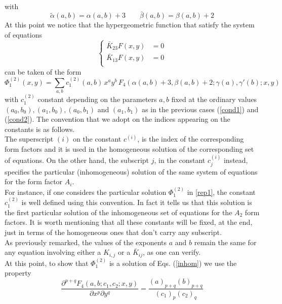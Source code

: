 \documentclass[a4paper,11pt,openright,twoside]{book}
\numberwithin{equation}{section}
\begin{document}
{{\begin{align}
\end{align}
with 
\begin{equation}
\tilde\alpha(a,b)=\alpha(a,b) + 3 \qquad \bar\beta(a,b)=\beta(a,b) +2
\end{equation}
At this point we notice that the hypergeometric function  that satisfy the system of equations
\begin{equation}
\left\{
\begin{split}
	\bar{K}_{23}F(x,y)&=0\\
	\bar{K}_{13}F(x,y)&=0\\
\end{split}
\right.
\end{equation}
can be taken of the form
\begin{equation}
\label{rep1}
\Phi_1^{(2)}(x,y)=\sum_{a,b} c^{(2)}_1(a,b)\,x^a y^b \,F_4(\alpha(a,b) +3, \beta(a,b)+2; \gamma(a), \gamma'(b) ; x, y)
\end{equation}
with $c^{(2)}_1$ constant depending on the parameters $a,b$ fixed at the ordinary values $(a_0,b_0), (a_1,b_0), (a_0,b_1)$ and $(a_1,b_1)$ as in the previous cases (\ref{cond1}) and (\ref{cond2}). 
The convention that we adopt on the indices appearing on the constants is as follows.\\
The superscript $(i)$ on the constant $c^{(i)}$, is the index of the corresponding form factors and it is used in the homogeneous solution of the corresponding set of equations. On the other hand, the subscript $j$, in the constant $c^{(i)}_j$ instead, specifies the particular (inhomogeneous) solution of the same system of equations for the form factor $A_i$.\\
For instance, if one considers the particular solution $\Phi_1^{(2)}$ in \eqref{rep1}, the constant $c_1^{(2)}$ is well defined using this convention. In fact it tells us that this solution is the first particular solution of the inhomogeneous set of equations for the $A_2$ form factors. It is worth mentioning that all these constants will be fixed, at the end, just in terms of the homogeneous ones that don't carry any subscript. \\
As previously remarked, the values of the exponents $a$ and $b$ remain the same for any equation involving either a $K_{i,j}$ or a $\bar{K}_{i j}$, as one can verify. \\
At this point, to show that $\Phi_1^{(2)}$  is a solution of  Eqs. (\ref{inhom}) we use the property 
\begin{equation}
\frac{\partial^{p+q} F_4(a,b;c_1,c_2;x,y)}{\partial x^p\partial y^q} =\frac{(a)_{p+q}(b)_{p+q}}{(c_1)_{p}(c_2)_{q}}

\end{equation}}}
\end{document}
